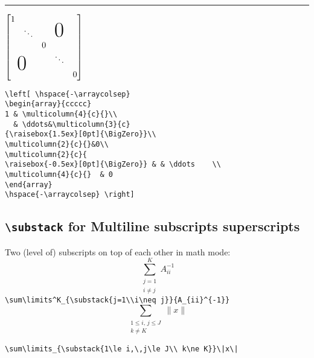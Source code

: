 %
%
\begin{center}{\rule{10cm}{0.5pt}}\end{center}
%
$\left[ \hspace{-\arraycolsep}
\begin{array}{ccccc}
1 & \multicolumn{4}{c}{}\\
  & \ddots&\multicolumn{3}{c}
{\raisebox{1.5ex}[0pt]{\BigZero}}\\
\multicolumn{2}{c}{}&0\\
\multicolumn{2}{c}{
\raisebox{-0.5ex}[0pt]{\BigZero}} & & \ddots    \\
\multicolumn{4}{c}{}  & 0
\end{array}
\hspace{-\arraycolsep} \right]$
%
%
\begin{verbatim}
\left[ \hspace{-\arraycolsep}
\begin{array}{ccccc}
1 & \multicolumn{4}{c}{}\\
  & \ddots&\multicolumn{3}{c}
{\raisebox{1.5ex}[0pt]{\BigZero}}\\
\multicolumn{2}{c}{}&0\\
\multicolumn{2}{c}{
\raisebox{-0.5ex}[0pt]{\BigZero}} & & \ddots    \\
\multicolumn{4}{c}{}  & 0
\end{array}
\hspace{-\arraycolsep} \right]
\end{verbatim}
%
%
\subsection{\texttt{\large \textbackslash substack} for Multiline subscripts superscripts}
%
Two (level of) subscripts on top of each other in math mode:
%
$$\sum\limits^K_{\substack{j=1\\i\neq j}}{A_{ii}^{-1}}$$
\verb!\sum\limits^K_{\substack{j=1\\i\neq j}}{A_{ii}^{-1}}!
%
$$\sum\limits_{\substack{1\le i,\,j\le J\\ k\ne K}}\|x\|$$ 
\begin{center}\verb!\sum\limits_{\substack{1\le i,\,j\le J\\ k\ne K}}\|x\|!\end{center}
%
%
%
\begin{center}\end{center}
